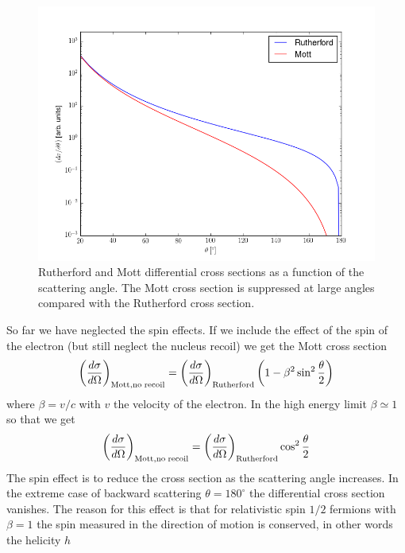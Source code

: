 \documentclass[12pt]{article}
\begin{document}
\begin{figure}
\begin{center}
\includegraphics[scale=0.35]{images/rutherfordMott.png}
\end{center}
\caption{Rutherford and Mott differential cross sections as a function of the scattering angle. The Mott cross section is suppressed at large angles compared with the Rutherford cross section.}\label{fig:mottVSruth}
\end{figure}
So far we have neglected the spin effects. If we include the effect of the spin of the electron (but still neglect the nucleus recoil) we get the Mott cross section 
\begin{equation}\label{eq:Mott}
\left(\frac{d\sigma}{d\Omega}\right)_{\rm{Mott,no\; recoil}}=\left(\frac{d\sigma}{d\Omega}\right)_{\rm{Rutherford}}\left(1-\beta^2\sin^2\frac{\theta}{2}\right)
\end{equation}
where $\beta=v/c$ with $v$ the velocity of the electron. In the high energy limit $\beta\simeq 1$ so that we get
\[\left(\frac{d\sigma}{d\Omega}\right)_{\rm{Mott,no\; recoil}}=\left(\frac{d\sigma}{d\Omega}\right)_{\rm{Rutherford}}\cos^2\frac{\theta}{2}\]
The spin effect is to reduce the cross section as the scattering angle increases. In the extreme case of backward scattering $\theta=180^\circ$ the differential cross section vanishes. The reason for this effect is that for relativistic spin $1/2$ fermions with $\beta=1$ the spin measured in the direction of motion is conserved, in other words the helicity $h$
\end{document}
